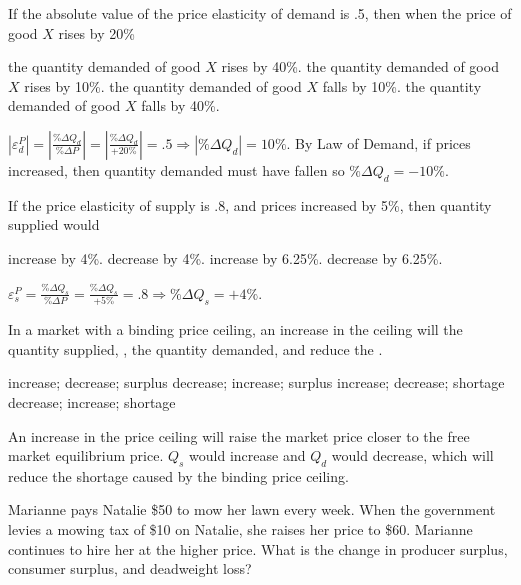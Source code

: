 \documentclass[addpoints,11pt]{exam}
\theoremstyle{definition}
\newcommand{\blank}[0]{\underline{\hspace{3cm}}}
\begin{document}
\begin{questions}
\question If the absolute value of the price elasticity of demand is .5, then when the price of good $X$ rises by 20\%

	\begin{choices}
		\choice the quantity demanded of good $X$ rises by 40\%.
		\choice the quantity demanded of good $X$ rises by 10\%.
		\CorrectChoice the quantity demanded of good $X$ falls by 10\%.
		\choice the quantity demanded of good $X$ falls by 40\%.
	\end{choices}

	
	\begin{solution}
		$|\varepsilon_d^P| = |\frac{\%\Delta Q_{d}}{\%\Delta P}| = |\frac{\%\Delta Q_{d}}{+20\%}| = .5 \Rightarrow |\%\Delta Q_{d}| = 10\%.$ By Law of Demand, if prices increased, then quantity demanded must have fallen so $\%\Delta Q_{d} = -10\%$.
	\end{solution}

	
	\question If the price elasticity of supply is .8, and prices increased by 5\%, then quantity supplied would
		
		\begin{choices}
			\CorrectChoice increase by 4\%.
			\choice decrease by 4\%.
			\choice increase by 6.25\%.
			\choice decrease by 6.25\%.
		\end{choices}

	\begin{solution}
		$\varepsilon_s^P = \frac{\%\Delta Q_{s}}{\%\Delta P} = \frac{\%\Delta Q_{s}}{+5\%} = .8 \Rightarrow \%\Delta Q_{s} = +4\%.$
	\end{solution}
	
	
	\question In a market with a binding price ceiling, an increase in the ceiling will \blank the quantity supplied, \blank, the quantity demanded, and reduce the \blank.
	
	\begin{choices}
		\choice increase; decrease; surplus
		\choice decrease; increase; surplus
		\CorrectChoice increase; decrease; shortage
		\choice decrease; increase; shortage
	\end{choices}
	
	\begin{solution}
		An increase in the price ceiling will raise the market price closer to the free market equilibrium price. $Q_s$ would increase and $Q_d$ would decrease, which will reduce the shortage caused by the binding price ceiling.
	\end{solution}

	
	\question Marianne pays Natalie \$50 to mow her lawn every week. When the government levies a mowing tax of \$10 on Natalie, she raises her price to \$60. Marianne continues to hire her at the higher price. What is the change in producer surplus, consumer surplus, and deadweight loss?
	

\end{questions}
\end{document}
